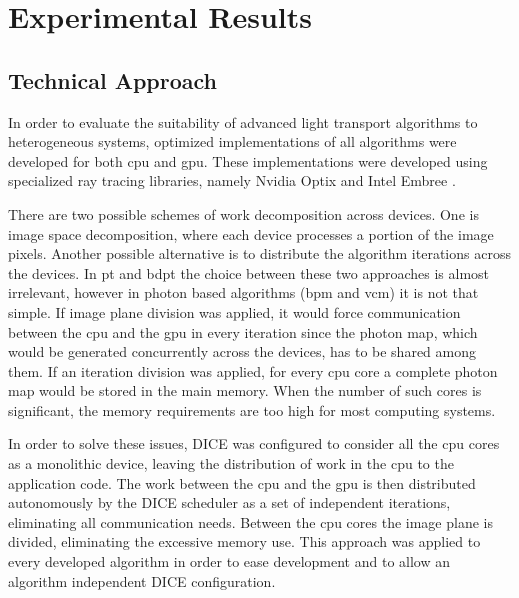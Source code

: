 \chapter{Experimental Results}

\section{Technical Approach}

In order to evaluate the suitability of advanced light transport algorithms to heterogeneous systems, optimized implementations of all algorithms were developed for both \gls{cpu} and \gls{gpu}. These implementations were developed using specialized ray tracing libraries, namely Nvidia Optix \citep{parker2010optix} and Intel Embree \citep{wald2014embree}.


There are two possible schemes of work decomposition across devices. One is image space decomposition, where each device processes a portion of the image pixels. Another possible alternative is to distribute the algorithm iterations across the devices. In \gls{pt} and \gls{bdpt} the choice between these two approaches is almost irrelevant, however in photon based algorithms (\gls{bpm} and \gls{vcm}) it is not that simple. If image plane division was applied, it would force communication between the \gls{cpu} and the \gls{gpu} in every iteration since the photon map, which would be generated concurrently across the devices, has to be shared among them. If an iteration division was applied, for every \gls{cpu} core a complete photon map would be stored in the main memory. When the number of such cores is significant, the memory requirements are too high for most computing systems.

In order to solve these issues, DICE was configured to consider all the \gls{cpu} cores as a monolithic device, leaving the distribution of work in the \gls{cpu} to the application code. The work between the \gls{cpu} and the \gls{gpu} is then distributed autonomously by the DICE scheduler as a set of independent iterations, eliminating all communication needs. Between the \gls{cpu} cores the image plane is divided, eliminating the excessive memory use. This approach was applied to every developed algorithm in order to ease development and to allow an algorithm independent DICE configuration.

